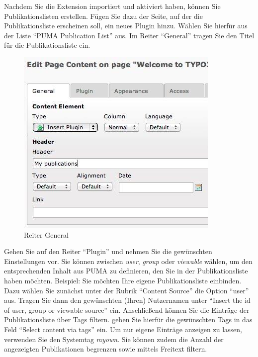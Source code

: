 Nachdem Sie die Extension importiert und aktiviert haben, können Sie Publikationslisten erstellen. Fügen Sie dazu der Seite, auf der die Publikationsliste erscheinen soll, ein neues Plugin hinzu. Wählen Sie hierfür aus der Liste \enquote{PUMA Publication List} aus.\newline
\newline
Im Reiter \enquote{General} tragen Sie den Titel für die Publikationsliste ein.
\begin{figure}[ht]
 \centering
 \includegraphics[scale=0.4]{puma-99}
 \caption{Reiter General}
 \label{figure1}
\end{figure}
\newline \newline
Gehen Sie auf den Reiter \enquote{Plugin} und nehmen Sie die gewünschten Einstellungen vor. Sie können zwischen \textit{user}, \textit{group} oder \textit{viewable} wählen, um den entsprechenden Inhalt aus PUMA zu definieren, den Sie in der Publikationsliste haben möchten.\newline
\newline
Beispiel: Sie möchten Ihre eigene Publikationsliste einbinden. Dazu wählen Sie zunächst unter der Rubrik \enquote{Content Source} die Option \enquote{user} aus. Tragen Sie dann den gewünschten (Ihren) Nutzernamen unter \enquote{Insert the id of user, group or viewable source} ein. Anschließend können Sie die Einträge der Publikationsliste über Tags filtern. geben Sie hierfür die gewünschten Tags in das Feld \enquote{Select content via tags} ein. Um nur eigene Einträge anzeigen zu lassen, verwenden Sie den Systemtag \textit{myown}. Sie können zudem die Anzahl der angezeigten Publikationen begrenzen sowie mittels Freitext filtern.

